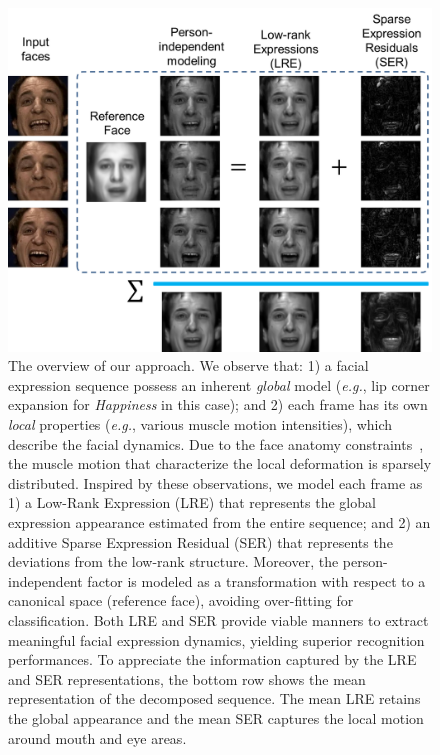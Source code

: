 \documentclass[journal]{IEEEtran}
\begin{document}
\begin{figure}[t]
	\centering
		\includegraphics[width=.95\columnwidth]{pics/splash.png}
	\caption{The overview of our approach. We observe that: 1) a facial expression sequence possess an inherent \textit{global} model (\textit{e.g.}, lip corner expansion for \textit{Happiness} in this case); and 2) each frame has its own \textit{local} properties (\textit{e.g.}, various muscle motion intensities), which describe the facial dynamics. Due to the face anatomy constraints~\cite{Ekman78}, the muscle motion that characterize the local deformation is sparsely distributed. Inspired by these observations, we model each frame as 1) a Low-Rank Expression (LRE) that represents the global expression appearance estimated from the entire sequence; and 2) an additive Sparse Expression Residual (SER) that represents the deviations from the low-rank structure. Moreover, the person-independent factor is modeled as a transformation with respect to a canonical space (reference face), avoiding over-fitting for classification. Both LRE and SER provide viable manners to extract meaningful facial expression dynamics, yielding superior recognition performances. To appreciate the information captured by the LRE and SER representations, the bottom row shows the mean representation of the decomposed sequence. The mean LRE retains the global appearance and the mean SER captures the local motion around mouth and eye areas.}
	\label{fig:splash}
\end{figure}
\end{document}
